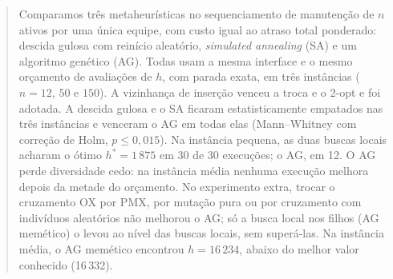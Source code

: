 \begin{abstract}
\noindent
Comparamos três metaheurísticas no sequenciamento de manutenção de $n$ ativos por uma única equipe, com custo igual ao atraso total ponderado: descida gulosa com reinício aleatório, \textit{simulated annealing} (SA) e um algoritmo genético (AG).
Todas usam a mesma interface e o mesmo orçamento de avaliações de $h$, com parada exata, em três instâncias ($n = 12$, $50$ e $150$).
A vizinhança de inserção venceu a troca e o 2-opt e foi adotada.
A descida gulosa e o SA ficaram estatisticamente empatados nas três instâncias e venceram o AG em todas elas (Mann--Whitney com correção de Holm, $p \le 0{,}015$).
Na instância pequena, as duas buscas locais acharam o ótimo $h^* = 1\,875$ em 30 de 30 execuções; o AG, em 12.
O AG perde diversidade cedo: na instância média nenhuma execução melhora depois da metade do orçamento.
No experimento extra, trocar o cruzamento OX por PMX, por mutação pura ou por cruzamento com indivíduos aleatórios não melhorou o AG; só a busca local nos filhos (AG memético) o levou ao nível das buscas locais, sem superá-las.
Na instância média, o AG memético encontrou $h = 16\,234$, abaixo do melhor valor conhecido (16\,332).
\end{abstract}
